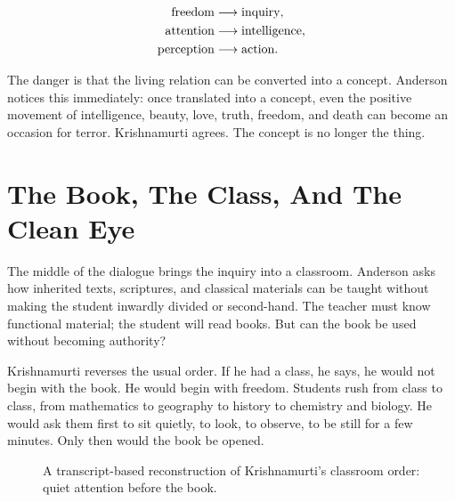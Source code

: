 \begin{align}
\hbox{freedom}
&\longrightarrow \hbox{inquiry},\\
\hbox{attention}
&\longrightarrow \hbox{intelligence},\\
\hbox{perception}
&\longrightarrow \hbox{action}.
\end{align}

The danger is that the living relation can be converted into a concept. Anderson notices this immediately: once translated into a concept, even the positive movement of intelligence, beauty, love, truth, freedom, and death can become an occasion for terror. Krishnamurti agrees. The concept is no longer the thing.

\section{The Book, The Class, And The Clean Eye}

The middle of the dialogue brings the inquiry into a classroom. Anderson asks how inherited texts, scriptures, and classical materials can be taught without making the student inwardly divided or second-hand. The teacher must know functional material; the student will read books. But can the book be used without becoming authority?

Krishnamurti reverses the usual order. If he had a class, he says, he would not begin with the book. He would begin with freedom. Students rush from class to class, from mathematics to geography to history to chemistry and biology. He would ask them first to sit quietly, to look, to observe, to be still for a few minutes. Only then would the book be opened.

\begin{figure}
\centering
{}
\caption{A transcript-based reconstruction of Krishnamurti's classroom order: quiet attention before the book.}
\end{figure}

